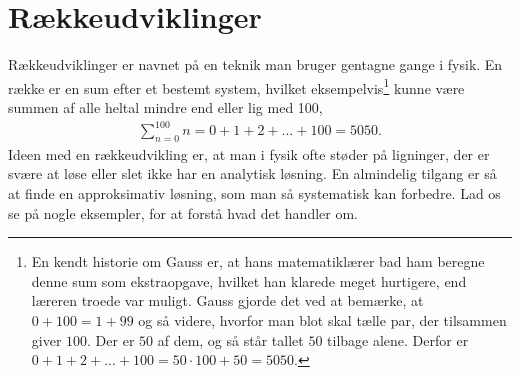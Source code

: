 \section{Rækkeudviklinger} \label{mat:sec:raekker}
Rækkeudviklinger er navnet på en teknik man bruger gentagne gange i fysik. En række er en sum efter et bestemt system, hvilket eksempelvis\footnote{En kendt historie om Gauss er, at hans matematiklærer bad ham beregne denne sum som ekstraopgave, hvilket han klarede meget hurtigere, end læreren troede var muligt. Gauss gjorde det ved at bemærke, at $0 + 100 = 1 + 99$ og så videre, hvorfor man blot skal tælle par, der tilsammen giver $100$. Der er $50$ af dem, og så står tallet $50$ tilbage alene. Derfor er $0 + 1 + 2 + ... + 100 = 50 \cdot 100 + 50 = 5050$.} kunne være summen af alle heltal mindre end eller lig med 100,
%
\begin{align}
    \sum_{n=0}^{100}n = 0 + 1 + 2 + \dots{} + 100 = 5050.
\end{align}
%
Ideen med en rækkeudvikling er, at man i fysik ofte støder på ligninger, der er svære at løse eller slet ikke har en analytisk løsning. En almindelig tilgang er så at finde en approksimativ løsning, som man så systematisk kan forbedre. Lad os se på nogle eksempler, for at forstå hvad det handler om.

